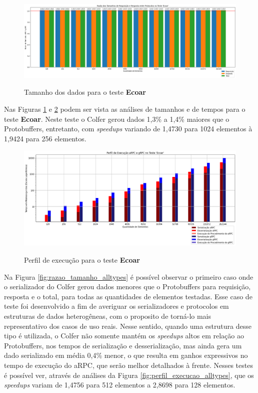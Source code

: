 \begin{figure}[ht]
    \centering
    \caption{Tamanho dos dados para o teste \textbf{Ecoar}}
    \includegraphics[width=\textwidth]{figuras/graficos/serializacao/razao_tamanho_largedata.png} 
    \label{fig:razao_tamanho_largedata}
\end{figure}

Nas Figuras \ref{fig:razao_tamanho_largedata} e \ref{fig:perfil_execucao_largedata} podem ser vista as análises de tamanhos e de tempos para o teste \textbf{Ecoar}. Neste teste o Colfer gerou dados 1,3\% a 1,4\% maiores que o Protobuffers, entretanto, com \textit{speedups} variando de 1,4730 para 1024 elementos à 1,9424 para 256 elementos.

\begin{figure}[ht]
    \centering
    \caption{Perfil de execução para o teste \textbf{Ecoar}}
    \includegraphics[width=\textwidth]{figuras/graficos/serializacao/perfil_execucao_largedata.png} 
    \label{fig:perfil_execucao_largedata}
\end{figure}

Na Figura \ref{fig:razao_tamanho_alltypes} é possível observar o primeiro caso onde o serializador do Colfer gerou dados menores que o Protobuffers para requisição, resposta e o total, para todas as quantidades de elementos testadas. Esse caso de teste foi desenvolvido a fim de averiguar os serializadores e protocolos em estruturas de dados heterogêneas, com o proposito de torná-lo mais representativo dos casos de uso reais. Nesse sentido, quando uma estrutura desse tipo é utilizada, o Colfer não somente mantém os \textit{speedups} altos em relação ao Protobuffers, nos tempos de serialização e desserialização, mas ainda gera um dado serializado em média 0,4\% menor, o que resulta em ganhos expressivos no tempo de execução do aRPC, que serão melhor detalhados à frente. Nesses testes é possível ver, através de análises da Figura \ref{fig:perfil_execucao_alltypes}, que os \textit{speedups} variam de 1,4756 para 512 elementos a 2,8698 para 128 elementos.

